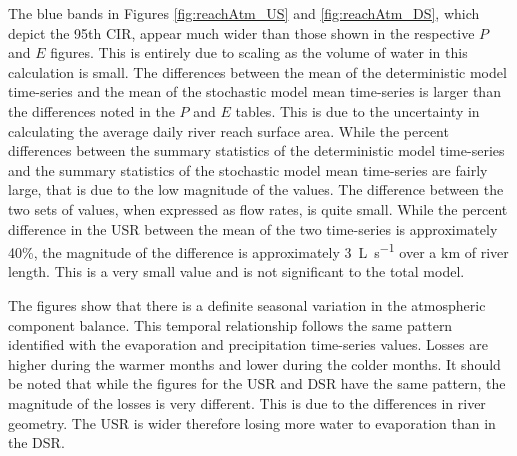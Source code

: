 \subtabletop
\begin{table}[htbp]
	\centering
	\caption[USR deterministic and stochastic model time-series total estimated atmospheric contribution to the water balance model numeric results.]{USR deterministic and stochastic model time-series total estimated atmospheric contribution to the water balance model numeric results.  Total daily contribution is presented in units of \si{\cubic\meter\per\second\per\kilo\meter} (\si{\cfs\per\mile}).}
	\label{tab:reachAtm_US}
	
\end{table}
\tablevspace
\begin{table}[htbp]
	\centering
	\caption[DSR deterministic and stochastic model time-series total estimated atmospheric contribution to the water balance model numeric results.]{DSR deterministic and stochastic model time-series total estimated atmospheric contribution to the water balance model numeric results.  Total daily contribution is presented in units of \si{\cubic\meter\per\second\per\kilo\meter} (\si{\cfs\per\mile}).}
	\label{tab:reachAtm_DS}
	
\end{table}

The blue bands in Figures \ref{fig:reachAtm_US} and \ref{fig:reachAtm_DS}, which depict the 95th CIR, appear much wider than those shown in the respective $ P $ and $ E $ figures.  This is entirely due to scaling as the volume of water in this calculation is small.  The differences between the mean of the deterministic model time-series and the mean of the stochastic model mean time-series is larger than the differences noted in the $ P $ and $ E $ tables.  This is due to the uncertainty in calculating the average daily river reach surface area.  While the percent differences between the summary statistics of the deterministic model time-series and the summary statistics of the stochastic model mean time-series are fairly large, that is due to the low magnitude of the values.  The difference between the two sets of values, when expressed as flow rates, is quite small.  While the percent difference in the USR between the mean of the two time-series is approximately 40\%, the magnitude of the difference is approximately \SI{3}{\liter\per\second} over a \si{\kilo\meter} of river length.  This is a very small value and is not significant to the total model.  

The figures show that there is a definite seasonal variation in the atmospheric component balance.  This temporal relationship follows the same pattern identified with the evaporation and precipitation time-series values.  Losses are higher during the warmer months and lower during the colder months.  It should be noted that while the figures for the USR and DSR have the same pattern, the magnitude of the losses is very different.  This is due to the differences in river geometry.  The USR is wider therefore losing more water to evaporation than in the DSR.

